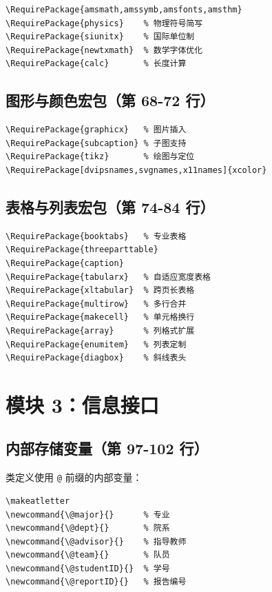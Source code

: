 \documentclass[linux]{hustreport}
\begin{document}
\begin{verbatim}
\RequirePackage{amsmath,amssymb,amsfonts,amsthm}
\RequirePackage{physics}    % 物理符号简写
\RequirePackage{siunitx}    % 国际单位制
\RequirePackage{newtxmath}  % 数学字体优化
\RequirePackage{calc}       % 长度计算
\end{verbatim}

\subsection{图形与颜色宏包（第 68-72 行）}

\begin{verbatim}
\RequirePackage{graphicx}   % 图片插入
\RequirePackage{subcaption} % 子图支持
\RequirePackage{tikz}       % 绘图与定位
\RequirePackage[dvipsnames,svgnames,x11names]{xcolor}
\end{verbatim}

\subsection{表格与列表宏包（第 74-84 行）}

\begin{verbatim}
\RequirePackage{booktabs}   % 专业表格
\RequirePackage{threeparttable}
\RequirePackage{caption}
\RequirePackage{tabularx}   % 自适应宽度表格
\RequirePackage{xltabular}  % 跨页长表格
\RequirePackage{multirow}   % 多行合并
\RequirePackage{makecell}   % 单元格换行
\RequirePackage{array}      % 列格式扩展
\RequirePackage{enumitem}   % 列表定制
\RequirePackage{diagbox}    % 斜线表头
\end{verbatim}

\newpage
\section{模块 3：信息接口}

\subsection{内部存储变量（第 97-102 行）}

类定义使用 \verb|@| 前缀的内部变量：

\begin{verbatim}
\makeatletter
\newcommand{\@major}{}      % 专业
\newcommand{\@dept}{}       % 院系
\newcommand{\@advisor}{}    % 指导教师
\newcommand{\@team}{}       % 队员
\newcommand{\@studentID}{}  % 学号
\newcommand{\@reportID}{}   % 报告编号
\end{verbatim}
\end{document}
